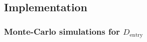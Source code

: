 \documentclass[11pt]{article}
\begin{document}

\subsection{Implementation}
\label{subsec:partA_implementation}


\subsubsection{Monte-Carlo simulations for $D_{\text{entry}}$}
\label{subsubsec:entryDetector_working}
\end{document}
